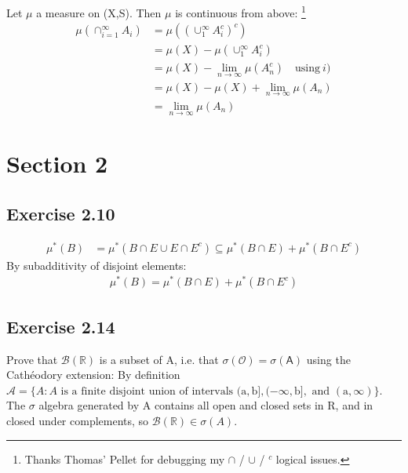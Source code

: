 \documentclass[11pt]{article}
\numberwithin{equation}{section}
\theoremstyle{plain}
\theoremstyle{definition}
\newcommand\parens[1]{\left( #1 \right)}
\def\ss{\subset}
\newcommand{\1}{\mathbbm 1}
\def\s{\sigma}
\newcommand{\RR}{\mathbb R}
\renewcommand{\AA}{\mathsf A}
\newcommand{\oO}{\mathcal O}
\newcommand{\bB}{\mathcal B}
\begin{document}
Let $\mu$ a measure on (X,S). Then $\mu$ is continuous from above: \footnote{Thanks Thomas' Pellet for debugging my $\cap$ / $\cup$ / $^c$ logical issues.}\\ 
\begin{align*}
	\mu (\cap^\infty_{i=1} A_i) &= \mu \parens{\parens{\cup^\infty_1 A^c_i}^c} \\
						   &=  \mu (X) - \mu \parens{\cup^\infty_1 A^c_i}\\
						   &= \mu (X) - \lim_{n \to \infty} \mu \parens{A^c_n} \quad \text{using} \ i) \\
						   &= \mu (X) - \mu (X) +\lim_{n \to \infty} \mu \parens{A_n} \\
						   &=  \lim_{n \to \infty} \mu \parens{A_n}
\end{align*}




\section*{Section 2} %
\label{sec:section_2}

\subsection*{Exercise 2.10} %

\begin{align*}
	\mu^{*}(B) &= \mu^{*}(B \cap E \cup E \cap E^c) \subseteq \mu^{*}(B \cap E) + \mu^{*}(B \cap E^c)
\end{align*}
By subadditivity of disjoint elements:
\begin{align*}
	\mu^{*}(B) = \mu^{*}(B \cap E) + \mu^{*}(B \cap E^c)
\end{align*}



\subsection*{Exercise 2.14} %
Prove that $\bB (\RR)$ is a subset of A, i.e. that $ \s (\oO) = \s (\AA)$ using the Cathéodory extension: By definition $ \mathcal{A}=\{A : A \text { is a finite disjoint union of intervals } (\mathrm{a}, \mathrm{b}],(-\infty, \mathrm{b}], \text { and }(\mathrm{a}, \infty) \}$. The $\s$ algebra generated by A contains all open and closed sets in R, and in closed under complements, so $\bB (\RR) \in \sigma(A)$.
\end{document}
